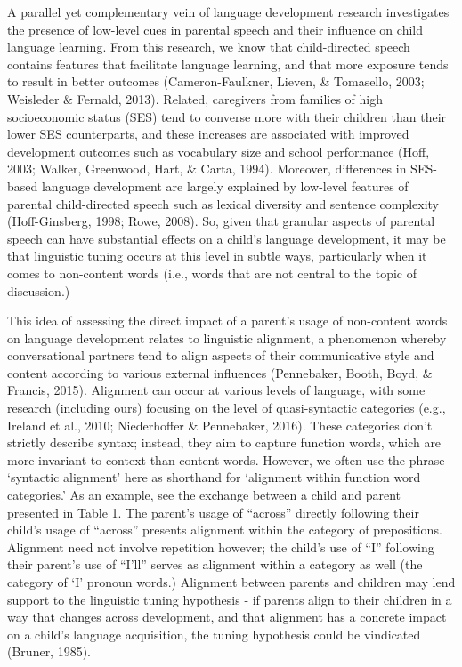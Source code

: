 \documentclass[10pt, letterpaper]{article}
\begin{document}
A parallel yet complementary vein of language development research
investigates the presence of low-level cues in parental speech and their
influence on child language learning. From this research, we know that
child-directed speech contains features that facilitate language
learning, and that more exposure tends to result in better outcomes
(Cameron-Faulkner, Lieven, \& Tomasello, 2003; Weisleder \& Fernald,
2013). Related, caregivers from families of high socioeconomic status
(SES) tend to converse more with their children than their lower SES
counterparts, and these increases are associated with improved
development outcomes such as vocabulary size and school performance
(Hoff, 2003; Walker, Greenwood, Hart, \& Carta, 1994). Moreover,
differences in SES-based language development are largely explained by
low-level features of parental child-directed speech such as lexical
diversity and sentence complexity (Hoff-Ginsberg, 1998; Rowe, 2008). So,
given that granular aspects of parental speech can have substantial
effects on a child's language development, it may be that linguistic
tuning occurs at this level in subtle ways, particularly when it comes
to non-content words (i.e., words that are not central to the topic of
discussion.)

This idea of assessing the direct impact of a parent's usage of
non-content words on language development relates to linguistic
alignment, a phenomenon whereby conversational partners tend to align
aspects of their communicative style and content according to various
external influences (Pennebaker, Booth, Boyd, \& Francis, 2015).
Alignment can occur at various levels of language, with some research
(including ours) focusing on the level of quasi-syntactic categories
(e.g., Ireland et al., 2010; Niederhoffer \& Pennebaker, 2016). These
categories don't strictly describe syntax; instead, they aim to capture
function words, which are more invariant to context than content words.
However, we often use the phrase `syntactic alignment' here as shorthand
for `alignment within function word categories.' As an example, see the
exchange between a child and parent presented in Table 1. The parent's
usage of ``across'' directly following their child's usage of ``across''
presents alignment within the category of prepositions. Alignment need
not involve repetition however; the child's use of ``I'' following their
parent's use of ``I'll'' serves as alignment within a category as well
(the category of `I' pronoun words.) Alignment between parents and
children may lend support to the linguistic tuning hypothesis - if
parents align to their children in a way that changes across
development, and that alignment has a concrete impact on a child's
language acquisition, the tuning hypothesis could be vindicated (Bruner,
1985).
\end{document}
